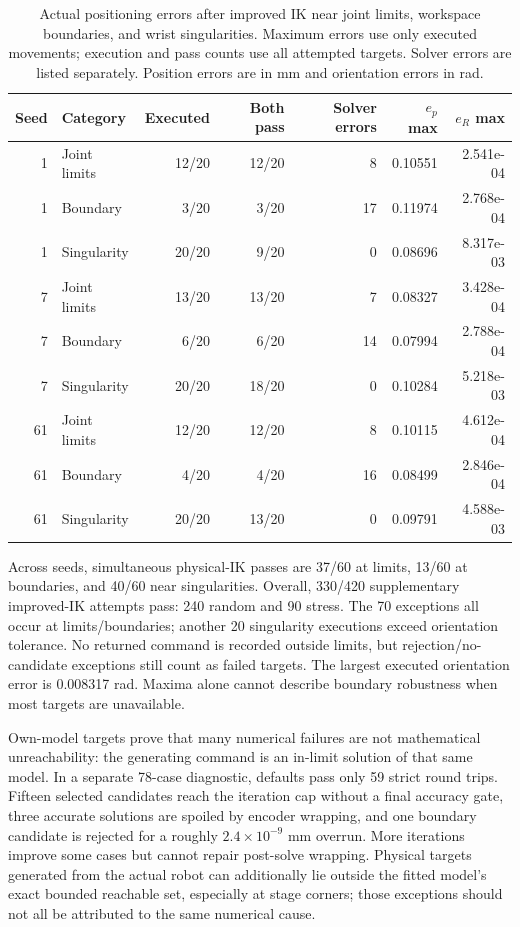 \documentclass[11pt,letterpaper]{article}
\begin{document}
\begin{table}[!htbp]\centering\small
\caption{Actual positioning errors after improved IK near joint limits, workspace boundaries, and wrist singularities. Maximum errors use only executed movements; execution and pass counts use all attempted targets. Solver errors are listed separately. Position errors are in mm and orientation errors in rad.}\label{tab:stress_ik}
\begin{tabular}{@{}rlrrrrr@{}}\toprule
Seed & Category & Executed & Both pass & Solver errors & $e_p$ max & $e_R$ max\\\midrule
1 & Joint limits & 12/20 & 12/20 & 8 & 0.10551 & 2.541e-04\\
1 & Boundary & 3/20 & 3/20 & 17 & 0.11974 & 2.768e-04\\
1 & Singularity & 20/20 & 9/20 & 0 & 0.08696 & 8.317e-03\\
7 & Joint limits & 13/20 & 13/20 & 7 & 0.08327 & 3.428e-04\\
7 & Boundary & 6/20 & 6/20 & 14 & 0.07994 & 2.788e-04\\
7 & Singularity & 20/20 & 18/20 & 0 & 0.10284 & 5.218e-03\\
61 & Joint limits & 12/20 & 12/20 & 8 & 0.10115 & 4.612e-04\\
61 & Boundary & 4/20 & 4/20 & 16 & 0.08499 & 2.846e-04\\
61 & Singularity & 20/20 & 13/20 & 0 & 0.09791 & 4.588e-03\\
\bottomrule\end{tabular}
\end{table}
Across seeds, simultaneous physical-IK passes are 37/60 at limits, 13/60 at boundaries, and 40/60 near singularities. Overall, 330/420 supplementary improved-IK attempts pass: 240 random and 90 stress. The 70 exceptions all occur at limits/boundaries; another 20 singularity executions exceed orientation tolerance. No returned command is recorded outside limits, but rejection/no-candidate exceptions still count as failed targets. The largest executed orientation error is 0.008317 rad. Maxima alone cannot describe boundary robustness when most targets are unavailable.

Own-model targets prove that many numerical failures are not mathematical unreachability: the generating command is an in-limit solution of that same model. In a separate 78-case diagnostic, defaults pass only 59 strict round trips. Fifteen selected candidates reach the iteration cap without a final accuracy gate, three accurate solutions are spoiled by encoder wrapping, and one boundary candidate is rejected for a roughly $2.4\times10^{-9}$ mm overrun. More iterations improve some cases but cannot repair post-solve wrapping. Physical targets generated from the actual robot can additionally lie outside the fitted model's exact bounded reachable set, especially at stage corners; those exceptions should not all be attributed to the same numerical cause.
\end{document}

